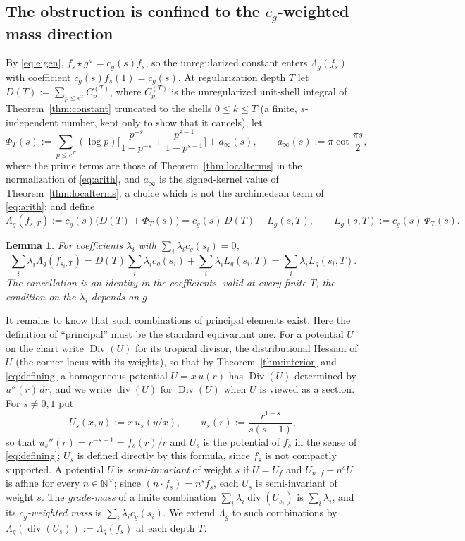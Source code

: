 \documentclass[11pt]{amsart}
\newtheorem{lemma}[theorem]{Lemma}
\theoremstyle{definition}
\theoremstyle{remark}
\newcommand{\N}{\mathbb N}
\newcommand{\Div}{\operatorname{Div}}
\newcommand{\divv}{\operatorname{div}}
\begin{document}
\subsection{The obstruction is confined to the $c_g$-weighted mass direction}
\label{subsec:totalmass}

By \eqref{eq:eigen}, $f_s\star g^\vee=c_g(s)f_s$, so the unregularized
constant enters $\Lambda_g(f_s)$ with coefficient $c_g(s)f_s(1)=c_g(s)$.
At regularization depth $T$ let $D(T):=\sum_{p\le e^T}C_p^{(T)}$, where
$C_p^{(T)}$ is the unregularized unit-shell integral of
Theorem~\ref{thm:constant} truncated to the shells $0\le k\le T$ (a finite,
$s$-independent number, kept only to show that it cancels), let
\[
 \Phi_T(s):=\sum_{p\le e^T}(\log p)\Big[\frac{p^{-s}}{1-p^{-s}}
 +\frac{p^{s-1}}{1-p^{s-1}}\Big]+a_\infty(s),
 \qquad a_\infty(s):=\pi\cot\frac{\pi s}{2},
\]
where the prime terms are those of Theorem~\ref{thm:localterms} in the
normalization of \eqref{eq:arith}, and $a_\infty$ is the signed-kernel
value of Theorem~\ref{thm:localterms}, a choice which is not the
archimedean term of \eqref{eq:arith}; and define
\[
 \Lambda_g(f_{s,T}):=c_g(s)\big(D(T)+\Phi_T(s)\big)=c_g(s)\,D(T)+L_g(s,T),
 \qquad L_g(s,T):=c_g(s)\,\Phi_T(s).
\]

\begin{lemma}\label{lem:cancel}
For coefficients $\lambda_i$ with $\sum_i\lambda_ic_g(s_i)=0$,
\[
 \sum_i\lambda_i\Lambda_g(f_{s_i,T})
 =D(T)\sum_i\lambda_ic_g(s_i)+\sum_i\lambda_iL_g(s_i,T)
 =\sum_i\lambda_iL_g(s_i,T).
\]
The cancellation is an identity in the coefficients, valid at every finite
$T$; the condition on the $\lambda_i$ depends on $g$.
\end{lemma}

It remains to know that such combinations of principal elements exist.
Here the definition of ``principal'' must be the standard equivariant one.
For a potential $U$ on the chart write $\Div(U)$ for its tropical divisor,
the distributional Hessian of $U$ (the corner locus with its weights), so
that by Theorem~\ref{thm:interior} and \eqref{eq:defining} a homogeneous
potential $U=x\,u(r)$ has $\Div(U)$ determined by $u''(r)\,dr$, and we
write $\divv(U)$ for $\Div(U)$ when $U$ is viewed as a section.  For
$s\neq0,1$ put
\[
 U_s(x,y):=x\,u_s(y/x),\qquad u_s(r):=\frac{r^{1-s}}{s(s-1)},
\]
so that $u_s''(r)=r^{-s-1}=f_s(r)/r$ and $U_s$ is the potential of $f_s$
in the sense of \eqref{eq:defining}; $U_s$ is defined directly by this
formula, since $f_s$ is not compactly supported.  A potential $U$ is
\emph{semi-invariant} of weight $s$ if $U=U_f$ and $U_{n\cdot f}-n^{s}U$ is
affine for every $n\in\N^\times$; since $(n\cdot f_s)=n^{s}f_s$, each
$U_s$ is semi-invariant of weight $s$.  The
\emph{grade-mass} of a finite combination $\sum_i\lambda_i\divv(U_{s_i})$ is
$\sum_i\lambda_i$, and its \emph{$c_g$-weighted mass} is
$\sum_i\lambda_ic_g(s_i)$.  We extend $\Lambda_g$ to such combinations by
$\Lambda_g(\divv(U_s)):=\Lambda_g(f_s)$ at each depth $T$.
\end{document}
